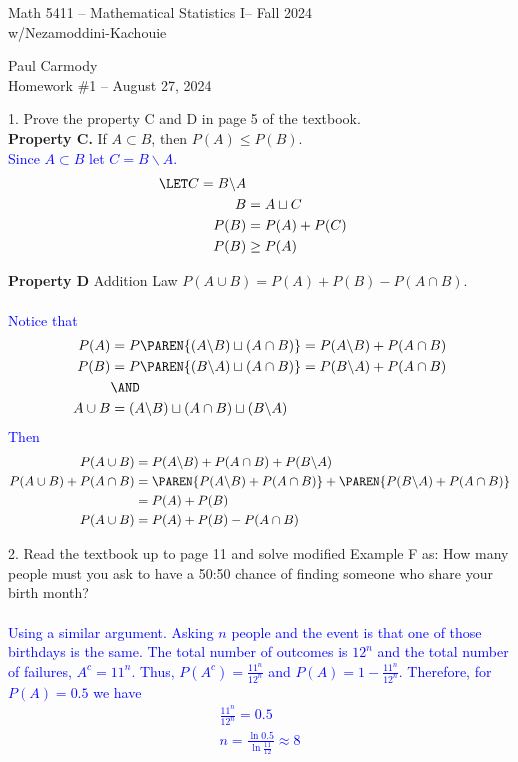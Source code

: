 \documentclass[10pt,a4paper]{report}
\newcommand{\CLASSNAME}{Math 5411 -- Mathematical Statistics I}
\newcommand{\PROFESSOR}{Nezamoddini-Kachouie}
\newcommand{\STUDENTNAME}{Paul Carmody}
\newcommand{\ASSIGNMENT}{Homework \#1 }
\newcommand{\DUEDATE}{August 27, 2024}
\newcommand{\SEMESTER}{Fall 2024}
\newcommand{\BLUE}[1]{\textcolor{blue}{#1}}
\begin{document}
\begin{center}
	\Large{\CLASSNAME -- \SEMESTER} \\
	\large{w/\PROFESSOR}
\end{center}
\begin{center}
	\STUDENTNAME \\
	\ASSIGNMENT -- \DUEDATE\\
\end{center}

1. Prove the property C and D in page 5 of the textbook. \\

\textbf{Property C.} If $A \subset B$, then $P(A) \le P(B)$.  \\
\BLUE{Since $A \subset B$ let $C = B\backslash A$.
\begin{align*}
	\LET C = B \backslash A\\
	B &= A \sqcup C\\
	P(B) &= P(A) + P(C)\\
	P(B) &\ge P(A)
\end{align*} }

\textbf{Property D} Addition Law $P(A \cup B) = P(A) + P(B)- P(A \cap B)$. \\ \\
\BLUE{ Notice that\begin{align*}
	P(A) &= P\PAREN{ (A\backslash B) \sqcup (A \cap B) } = P(A\backslash B)+P (A \cap B) \\
	P(B) &= P\PAREN{ (B\backslash A) \sqcup (A \cap B) } = P(B\backslash A)+P (A \cap B) \\ 
	&\AND \\
	A \cup B &= (A\backslash B) \sqcup (A \cap B) \sqcup (B \backslash A)
\end{align*}Then
\begin{align*}
	P(A \cup B) &= P(A\backslash B) +P (A \cap B) + P(B \backslash A) \\
		P(A \cup B) + P(A \cap B) &= \PAREN{ P(A\backslash B) +P (A \cap B)} + \PAREN{P(B \backslash A) + P(A \cap B)} \\
		&= P(A)+P(B) \\
	P(A \cup B) &= P(A) + P(B)- P(A \cap B)
\end{align*} }
\newpage

2. Read the textbook up to page 11 and solve modified Example F as: How many people must you ask to have a 50:50 chance of finding someone who share your birth month?\\
\\\BLUE{ Using a similar argument.  Asking $n$ people and the event is that one of those birthdays is the same.  The total number of outcomes is $12^n$ and the total number of failures, $A^c = 11^n$.  Thus, $P(A^c) = \frac{11^n}{12^n}$ and $P(A) = 1-\frac{11^n}{12^n}$.  Therefore, for $P(A) = 0.5$ we have 
\begin{align*}
	\frac{11^n}{12^n}=0.5\\
	n= \frac{\ln 0.5}{\ln \frac{11}{12} } \approx 8
\end{align*} }
\end{document}
